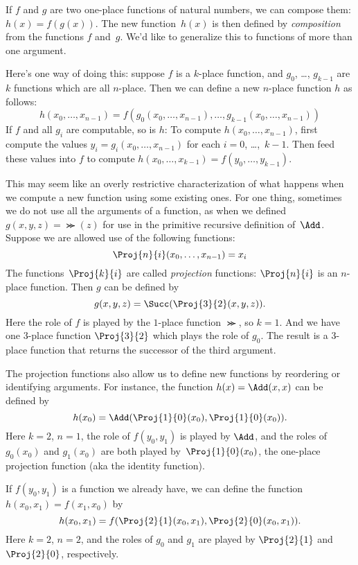 \documentclass[../../../include/open-logic-section]{subfiles}
\begin{document}

If $f$ and $g$ are two one-place functions of natural numbers, we can
compose them: $h(x) = f(g(x))$. The new function~$h(x)$ is then
defined by \emph{composition} from the functions $f$ and~$g$. We'd
like to generalize this to functions of more than one argument.

Here's one way of doing this: suppose $f$ is a $k$-place function,
and $g_0$, \dots, $g_{k-1}$ are $k$ functions which are all
$n$-place. Then we can define a new $n$-place function $h$ as follows:
\[
h(x_0, \dots, x_{n-1}) =
f(g_0(x_0, \dots, x_{n-1}), \dots, g_{k-1}(x_0, \dots, x_{n-1}))
\]
If $f$ and all $g_i$ are computable, so is $h$: To compute $h(x_0,
\dots, x_{n-1})$, first compute the values $y_i = g_i(x_0, \dots,
x_{n-1})$ for each $i = 0$, \dots,~$k-1$. Then feed these values into
$f$ to compute $h(x_0, \dots, x_{k-1}) = f(y_0, \dots, y_{k-1})$.

This may seem like an overly restrictive characterization of what
happens when we compute a new function using some existing ones. For
one thing, sometimes we do not use all the arguments of a function, as
when we defined $g(x, y, z) = \Succ(z)$ for use in the primitive
recursive definition of~$\Add$. Suppose we are allowed use of the
following functions:
\[
\Proj{n}{i}(x_0, \dots, x_{n-1}) = x_i
\]
The functions~$\Proj{k}{i}$ are called \emph{projection} functions:
$\Proj{n}{i}$ is an $n$-place function. Then $g$ can be defined by
\[
g(x, y, z) = \Succ(\Proj{3}{2}(x, y, z)).
\]
Here the role of $f$ is played by the $1$-place function $\Succ$, so
$k=1$. And we have one $3$-place function $\Proj{3}{2}$ which plays
the role of $g_0$. The result is a $3$-place function that returns the
successor of the third argument.

The projection functions also allow us to define new functions by
reordering or identifying arguments. For instance, the function $h(x)
= \Add(x, x)$ can be defined by
\[
h(x_0) = \Add(\Proj{1}{0}(x_0),\Proj{1}{0}(x_0)).
\]
Here $k=2$, $n=1$, the role of $f(y_0,y_1)$ is played by $\Add$, and
the roles of $g_0(x_0)$ and $g_1(x_0)$ are both played
by~$\Proj{1}{0}(x_0)$, the one-place projection function (aka the
identity function).

If $f(y_0, y_1)$ is a function we already have, we can define the
function $h(x_0, x_1) = f(x_1, x_0)$ by
\[
h(x_0, x_1) = f(\Proj{2}{1}(x_0, x_1),\Proj{2}{0}(x_0, x_1)).
\]
Here $k=2$, $n = 2$, and the roles of $g_0$ and $g_1$ are played by
$\Proj{2}{1}$ and~$\Proj{2}{0}$, respectively.
\end{document}
